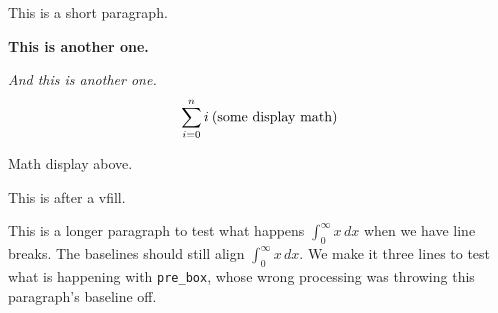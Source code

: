 
\nopagenumbers
\par This is a short paragraph.
\par\bf This is another one.\rm
\par\it And this is another one.\rm
$$\sum_{i=0}^n i\> \hbox{\rm (some display math)}$$
\par Math display above.
\vfill
\par This is after a vfill.
\par This is a longer paragraph to test what happens $\int_0^\infty x\,dx$ when we have line breaks. The baselines should still align
$\int_0^\infty x\,dx$. We make it three lines to test what is happening with {\tt pre\_box}, whose wrong processing was throwing this
paragraph's baseline off.
\bye
